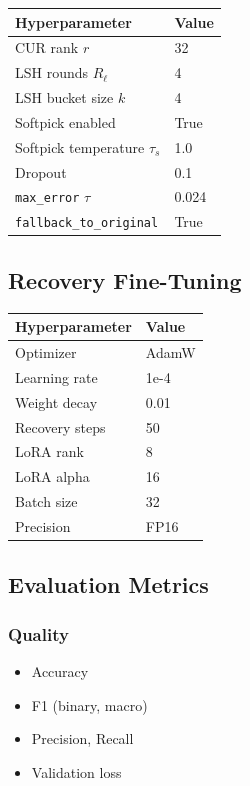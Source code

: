 \begin{table}[H]
\centering
\small
\begin{tabular}{ll}
\toprule
\textbf{Hyperparameter} & \textbf{Value} \\
\midrule
CUR rank $r$ & 32 \\
LSH rounds $R_\ell$ & 4 \\
LSH bucket size $k$ & 4 \\
Softpick enabled & True \\
Softpick temperature $\tau_s$ & 1.0 \\
Dropout & 0.1 \\
\texttt{max\_error} $\tau$ & 0.024 \\
\texttt{fallback\_to\_original} & True \\
\bottomrule
\end{tabular}
\end{table}

\subsection{Recovery Fine-Tuning}

\begin{table}[H]
\centering
\small
\begin{tabular}{ll}
\toprule
\textbf{Hyperparameter} & \textbf{Value} \\
\midrule
Optimizer & AdamW \\
Learning rate & 1e-4 \\
Weight decay & 0.01 \\
Recovery steps & 50 \\
LoRA rank & 8 \\
LoRA alpha & 16 \\
Batch size & 32 \\
Precision & FP16 \\
\bottomrule
\end{tabular}
\end{table}

\subsection{Evaluation Metrics}

\subsubsection{Quality}
\begin{itemize}
\item Accuracy
\item F1 (binary, macro)
\item Precision, Recall
\item Validation loss

\end{itemize}
